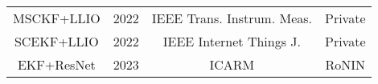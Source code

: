 \begin{frame}
{\begin{tabular*}{\linewidth}{@{\extracolsep{\fill}}cccc}
			               MSCKF+LLIO & 2022 & IEEE Trans. Instrum. Meas.      & Private                  \\ %
			               SCEKF+LLIO & 2022 & IEEE Internet Things J.         & Private                  \\ %
			               EKF+ResNet & 2023 & ICARM                           & RoNIN                    \\ %
			\bottomrule
		\end{tabular*}       
	}
	
\end{frame}

